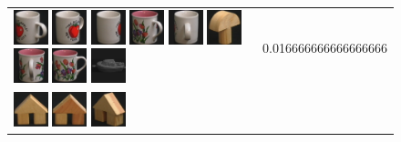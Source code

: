{\begin{figure}[p]
\begin{tabular}{m{11cm} | m{3cm} |}
\includegraphics[width=1cm]{coil/beeld-40.eps}
\includegraphics[width=1cm]{coil/beeld-39.eps}
\includegraphics[width=1cm]{coil/beeld-38.eps}
\includegraphics[width=1cm]{coil/beeld-10.eps}
\includegraphics[width=1cm]{coil/beeld-41.eps}
\includegraphics[width=1cm]{coil/beeld-3.eps}
\includegraphics[width=1cm]{coil/beeld-11.eps}
\includegraphics[width=1cm]{coil/beeld-6.eps}
\includegraphics[width=1cm]{coil/beeld-24.eps}
& {\scriptsize 0.016666666666666666}
\\
\includegraphics[width=1cm]{coil/beeld-42.eps}
\includegraphics[width=1cm]{coil/beeld-43.eps}
\includegraphics[width=1cm]{coil/beeld-46.eps}

\end{tabular}
\end{figure}}
